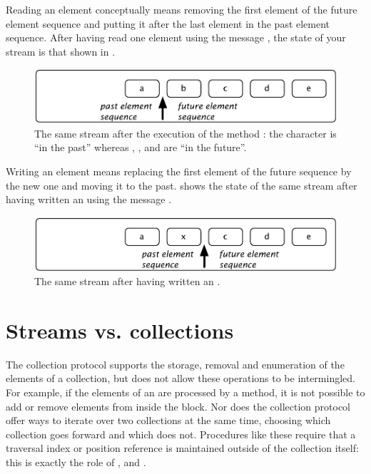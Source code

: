 \documentclass[a4paper,10pt,twoside]{book}
\begin{document}
Reading an element conceptually means removing the first element of the future element sequence  and putting it after the last element in the past
element sequence. After having read one element using the message , the state of your stream is that shown in .

\begin{figure}[ht]
\centerline{\includegraphics[scale=0.5]{a_bcdeStef}}
\caption{The same stream after the execution of the method : the character  is ``in the past'' whereas , ,  and  are ``in the future''.}
\vspace{.2in}
\end{figure}

Writing an element means replacing the first element of the future sequence by the new one and moving it to the past.  shows the state of the same stream after having written an  using the message  .

\begin{figure}[h!t]
\centerline{\includegraphics[scale=0.5]{ax_cdeStef}}
\caption{The same stream after having written an .}
\vspace{.2in}
\end{figure}

\section{Streams vs. collections}

The collection protocol supports the storage, removal and enumeration
of the elements of a collection, but does not allow these operations
to be intermingled.  For example, if the elements of an
 are processed by a  method, it is not
possible to add or remove elements from inside the  block.
Nor does the collection protocol offer ways to iterate over two
collections at the same time, choosing which collection goes forward
and which does not. Procedures like these require that a traversal index or
position reference is maintained outside of the collection itself:
this is exactly the role of ,  and
.
\end{document}
